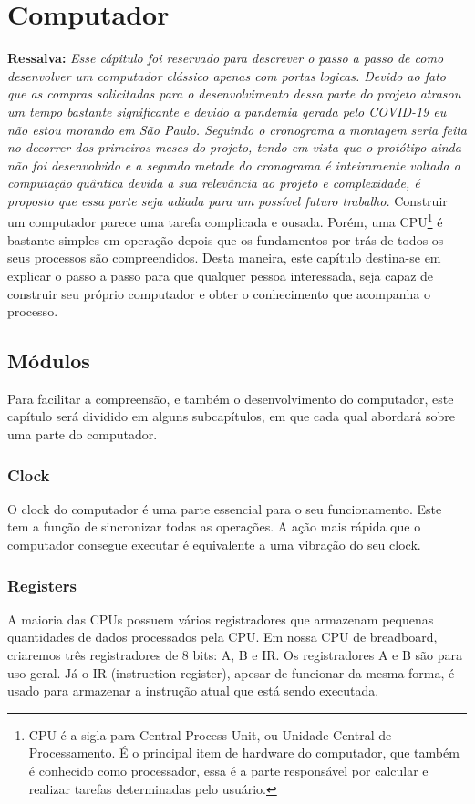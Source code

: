 \section{Computador} 
\textbf{Ressalva: }
\textit{ Esse cápitulo foi reservado para descrever o passo a passo de como desenvolver um computador clássico apenas com portas logicas. Devido ao fato que as compras solicitadas para o desenvolvimento dessa parte do projeto atrasou um tempo  bastante significante e devido a pandemia gerada pelo COVID-19 eu não estou morando em São Paulo. Seguindo o cronograma a montagem seria feita no decorrer dos primeiros meses do projeto, tendo em vista que o protótipo ainda não foi desenvolvido e a segundo metade do cronograma é inteiramente voltada a computação quântica devida a sua relevância ao projeto e complexidade, é proposto que essa parte seja adiada para um possível futuro trabalho.}
\newline
\newline
Construir um computador parece uma tarefa complicada e ousada. Porém, uma CPU\footnote{CPU é a sigla para Central Process Unit, ou Unidade Central de Processamento. É o principal item de hardware do computador, que também é conhecido como processador, essa é a parte responsável por calcular e realizar tarefas determinadas pelo usuário.} é bastante simples em operação depois que os fundamentos por trás de todos os seus processos são compreendidos. Desta maneira, este capítulo destina-se em explicar o passo a passo para que qualquer pessoa interessada, seja capaz de construir seu próprio computador e obter o conhecimento que acompanha o processo.

\subsection{Módulos}
Para facilitar a compreensão, e também o desenvolvimento do computador, este capítulo será dividido em alguns subcapítulos, em que cada qual abordará sobre uma parte do computador.

\subsubsection{Clock}
O clock do computador é uma parte essencial para o seu funcionamento. Este tem a função de sincronizar todas as operações. A ação mais rápida que o computador consegue executar é equivalente a uma vibração do seu clock.

\subsubsection{Registers}
A maioria das CPUs possuem vários registradores que armazenam pequenas quantidades de dados processados pela CPU. Em nossa CPU de breadboard, criaremos três registradores de 8 bits: A, B e IR. Os registradores A e B são para uso geral. Já o IR (instruction register), apesar de funcionar da mesma forma, é usado para armazenar a instrução atual que está sendo executada.

